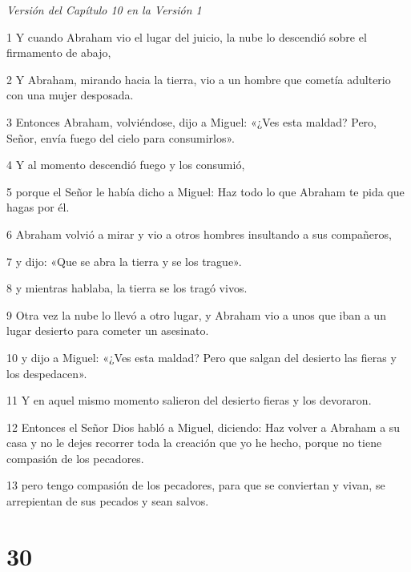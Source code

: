 \par \textit{Versión del Capítulo 10 en la Versión 1}

\par 1 Y cuando Abraham vio el lugar del juicio, la nube lo descendió sobre el firmamento de abajo,

\par 2 Y Abraham, mirando hacia la tierra, vio a un hombre que cometía adulterio con una mujer desposada.

\par 3 Entonces Abraham, volviéndose, dijo a Miguel: «¿Ves esta maldad? Pero, Señor, envía fuego del cielo para consumirlos».

\par 4 Y al momento descendió fuego y los consumió,

\par 5 porque el Señor le había dicho a Miguel: Haz todo lo que Abraham te pida que hagas por él.

\par 6 Abraham volvió a mirar y vio a otros hombres insultando a sus compañeros,

\par 7 y dijo: «Que se abra la tierra y se los trague».

\par 8 y mientras hablaba, la tierra se los tragó vivos.

\par 9 Otra vez la nube lo llevó a otro lugar, y Abraham vio a unos que iban a un lugar desierto para cometer un asesinato.

\par 10 y dijo a Miguel: «¿Ves esta maldad? Pero que salgan del desierto las fieras y los despedacen».

\par 11 Y en aquel mismo momento salieron del desierto fieras y los devoraron.

\par 12 Entonces el Señor Dios habló a Miguel, diciendo: Haz volver a Abraham a su casa y no le dejes recorrer toda la creación que yo he hecho, porque no tiene compasión de los pecadores.

\par 13 pero tengo compasión de los pecadores, para que se conviertan y vivan, se arrepientan de sus pecados y sean salvos.

\chapter{30}

